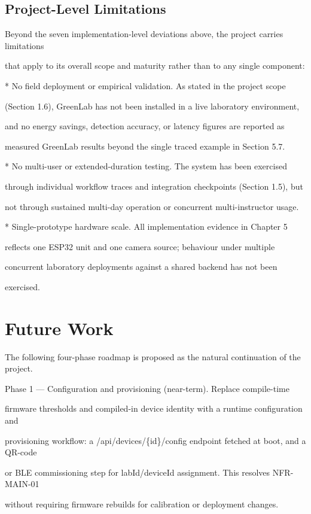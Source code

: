\subsection{Project-Level Limitations}
Beyond the seven implementation-level deviations above, the project carries limitations

that apply to its overall scope and maturity rather than to any single component:

* No field deployment or empirical validation. As stated in the project scope

(Section 1.6), GreenLab has not been installed in a live laboratory environment,

and no energy savings, detection accuracy, or latency figures are reported as

measured GreenLab results beyond the single traced example in Section 5.7.

* No multi-user or extended-duration testing. The system has been exercised

through individual workflow traces and integration checkpoints (Section 1.5), but

not through sustained multi-day operation or concurrent multi-instructor usage.

* Single-prototype hardware scale. All implementation evidence in Chapter 5

reflects one ESP32 unit and one camera source; behaviour under multiple

concurrent laboratory deployments against a shared backend has not been

exercised.


\section{Future Work}
The following four-phase roadmap is proposed as the natural continuation of the project.

Phase 1 --- Configuration and provisioning (near-term). Replace compile-time

firmware thresholds and compiled-in device identity with a runtime configuration and

provisioning workflow: a /api/devices/\{id\}/config endpoint fetched at boot, and a QR-code

or BLE commissioning step for labId/deviceId assignment. This resolves NFR-MAIN-01

without requiring firmware rebuilds for calibration or deployment changes.

